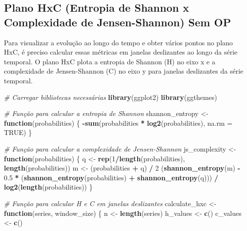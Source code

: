\documentclass[
]{article}
\newenvironment{Shaded}{\begin{snugshade}}{\end{snugshade}}
\newcommand{\AttributeTok}[1]{\textcolor[rgb]{0.13,0.29,0.53}{#1}}
\newcommand{\CommentTok}[1]{\textcolor[rgb]{0.56,0.35,0.01}{\textit{#1}}}
\newcommand{\ConstantTok}[1]{\textcolor[rgb]{0.56,0.35,0.01}{#1}}
\newcommand{\ControlFlowTok}[1]{\textcolor[rgb]{0.13,0.29,0.53}{\textbf{#1}}}
\newcommand{\DecValTok}[1]{\textcolor[rgb]{0.00,0.00,0.81}{#1}}
\newcommand{\FloatTok}[1]{\textcolor[rgb]{0.00,0.00,0.81}{#1}}
\newcommand{\FunctionTok}[1]{\textcolor[rgb]{0.13,0.29,0.53}{\textbf{#1}}}
\newcommand{\NormalTok}[1]{#1}
\newcommand{\OtherTok}[1]{\textcolor[rgb]{0.56,0.35,0.01}{#1}}
\newcommand{\SpecialCharTok}[1]{\textcolor[rgb]{0.81,0.36,0.00}{\textbf{#1}}}
\begin{document}
\hypertarget{plano-hxc-entropia-de-shannon-x-complexidade-de-jensen-shannon-sem-op}{%
\subsection{Plano HxC (Entropia de Shannon x Complexidade de
Jensen-Shannon) Sem
OP}\label{plano-hxc-entropia-de-shannon-x-complexidade-de-jensen-shannon-sem-op}}

Para visualizar a evolução ao longo do tempo e obter vários pontos no
plano HxC, é preciso calcular essas métricas em janelas deslizantes ao
longo da série temporal. O plano HxC plota a entropia de Shannon (H) no
eixo x e a complexidade de Jensen-Shannon (C) no eixo y para janelas
deslizantes da série temporal.

\begin{Shaded}
\begin{Highlighting}[]
\CommentTok{\# Carregar bibliotecas necessárias}
\FunctionTok{library}\NormalTok{(ggplot2)}
\FunctionTok{library}\NormalTok{(ggthemes)}

\CommentTok{\# Função para calcular a entropia de Shannon}
\NormalTok{shannon\_entropy }\OtherTok{\textless{}{-}} \ControlFlowTok{function}\NormalTok{(probabilities) \{}
  \SpecialCharTok{{-}}\FunctionTok{sum}\NormalTok{(probabilities }\SpecialCharTok{*} \FunctionTok{log2}\NormalTok{(probabilities), }\AttributeTok{na.rm =} \ConstantTok{TRUE}\NormalTok{)}
\NormalTok{\}}

\CommentTok{\# Função para calcular a complexidade de Jensen{-}Shannon}
\NormalTok{js\_complexity }\OtherTok{\textless{}{-}} \ControlFlowTok{function}\NormalTok{(probabilities) \{}
\NormalTok{  q }\OtherTok{\textless{}{-}} \FunctionTok{rep}\NormalTok{(}\DecValTok{1}\SpecialCharTok{/}\FunctionTok{length}\NormalTok{(probabilities), }\FunctionTok{length}\NormalTok{(probabilities))}
\NormalTok{  m }\OtherTok{\textless{}{-}}\NormalTok{ (probabilities }\SpecialCharTok{+}\NormalTok{ q) }\SpecialCharTok{/} \DecValTok{2}
\NormalTok{  (}\FunctionTok{shannon\_entropy}\NormalTok{(m) }\SpecialCharTok{{-}} \FloatTok{0.5} \SpecialCharTok{*}\NormalTok{ (}\FunctionTok{shannon\_entropy}\NormalTok{(probabilities) }\SpecialCharTok{+} \FunctionTok{shannon\_entropy}\NormalTok{(q))) }\SpecialCharTok{/} \FunctionTok{log2}\NormalTok{(}\FunctionTok{length}\NormalTok{(probabilities))}
\NormalTok{\}}

\CommentTok{\# Função para calcular H e C em janelas deslizantes}
\NormalTok{calculate\_hxc }\OtherTok{\textless{}{-}} \ControlFlowTok{function}\NormalTok{(series, window\_size) \{}
\NormalTok{  n }\OtherTok{\textless{}{-}} \FunctionTok{length}\NormalTok{(series)}
\NormalTok{  h\_values }\OtherTok{\textless{}{-}} \FunctionTok{c}\NormalTok{()}
\NormalTok{  c\_values }\OtherTok{\textless{}{-}} \FunctionTok{c}\NormalTok{()}
  

\end{Highlighting}
\end{Shaded}
\end{document}
